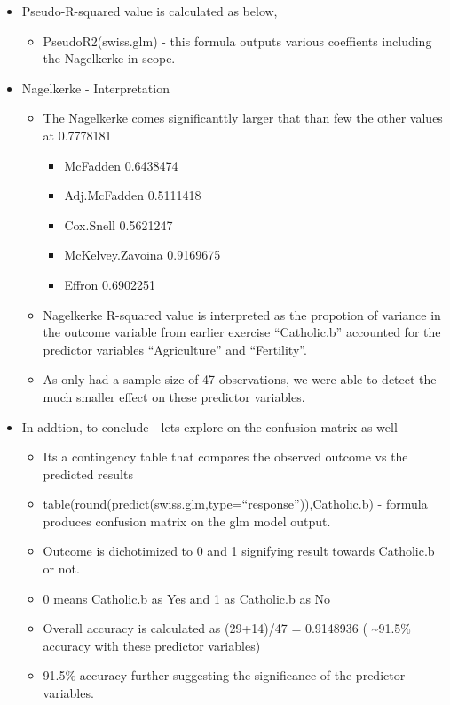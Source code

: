 \documentclass[]{article}
\providecommand{\tightlist}{%
  \setlength{\itemsep}{0pt}\setlength{\parskip}{0pt}}
\begin{document}
\begin{itemize}
\tightlist
\item
  Pseudo-R-squared value is calculated as below,

  \begin{itemize}
  \tightlist
  \item
    PseudoR2(swiss.glm) - this formula outputs various coeffients
    including the Nagelkerke in scope.
  \end{itemize}
\item
  Nagelkerke - Interpretation

  \begin{itemize}
  \tightlist
  \item
    The Nagelkerke comes significanttly larger that than few the other
    values at 0.7778181

    \begin{itemize}
    \tightlist
    \item
      McFadden 0.6438474
    \item
      Adj.McFadden 0.5111418
    \item
      Cox.Snell 0.5621247
    \item
      McKelvey.Zavoina 0.9169675
    \item
      Effron 0.6902251
    \end{itemize}
  \item
    Nagelkerke R-squared value is interpreted as the propotion of
    variance in the outcome variable from earlier exercise
    ``Catholic.b'' accounted for the predictor variables ``Agriculture''
    and ``Fertility''.
  \item
    As only had a sample size of 47 observations, we were able to detect
    the much smaller effect on these predictor variables.
  \end{itemize}
\item
  In addtion, to conclude - lets explore on the confusion matrix as well

  \begin{itemize}
  \tightlist
  \item
    Its a contingency table that compares the observed outcome vs the
    predicted results
  \item
    table(round(predict(swiss.glm,type=``response'')),Catholic.b) -
    formula produces confusion matrix on the glm model output.
  \item
    Outcome is dichotimized to 0 and 1 signifying result towards
    Catholic.b or not.
  \item
    0 means Catholic.b as Yes and 1 as Catholic.b as No
  \item
    Overall accuracy is calculated as (29+14)/47 = 0.9148936 (
    \textasciitilde{}91.5\% accuracy with these predictor variables)
  \item
    91.5\% accuracy further suggesting the significance of the predictor
    variables.
  \end{itemize}
\end{itemize}
\end{document}
